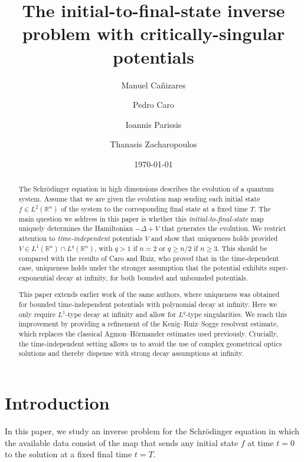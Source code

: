 \documentclass[11pt,a4paper]{amsart}
\title[Initial-to-final-state inverse problem]{The initial-to-final-state inverse problem with critically-singular potentials}
\author[M. Cañizares]{Manuel Cañizares}
\author[P. Caro]{Pedro Caro}
\author[I. Parissis]{Ioannis Parissis}
\author[T. Zacharopoulos]{Thanasis Zacharopoulos}
\theoremstyle{remark}
\theoremstyle{definition}
\newcommand{\R}{\mathbb{R}}
\begin{document}
\begin{abstract} The Schr\"odinger equation in high dimensions describes the evolution of a quantum system. Assume that we are given the evolution map sending each initial state $f\in L^2(\R^n)$ of the system to the corresponding final state at a fixed time $T$. The main question we address in this paper is whether this \emph{initial-to-final-state} map uniquely determines the Hamiltonian $-\Delta+V$ that generates the evolution. We restrict attention to \emph{time-independent} potentials $V$ and show that uniqueness holds provided $V \in L^1(\R^n)\cap L^q(\R^n)$, with $q>1$ if $n=2$ or $q\geq n/2$ if $n\geq 3$. This should be compared with the results of Caro and Ruiz, who proved that in the time-dependent case, uniqueness holds under the stronger assumption that the potential exhibits super-exponential decay at infinity, for both bounded and unbounded potentials.

This paper extends earlier work of the same authors, where uniqueness was obtained for bounded time-independent potentials with polynomial decay at infinity. Here we only require $L^1$-type decay at infinity and allow for $L^q$-type singularities. We reach this improvement by providing a refinement of the Kenig--Ruiz--Sogge resolvent estimate, which replaces the classical Agmon--H\"ormander estimates used previously. Crucially, the time-independent setting allows us to avoid the use of complex geometrical optics solutions and thereby dispense with strong decay assumptions at infinity.
\end{abstract}


\date{\today}


\maketitle

\section{Introduction}
In this paper, we study an inverse problem for the Schr\"odinger equation in which the available data consist of the map that sends any initial state $f$ at time $t=0$ to the solution at a fixed final time $t=T$.
\end{document}
